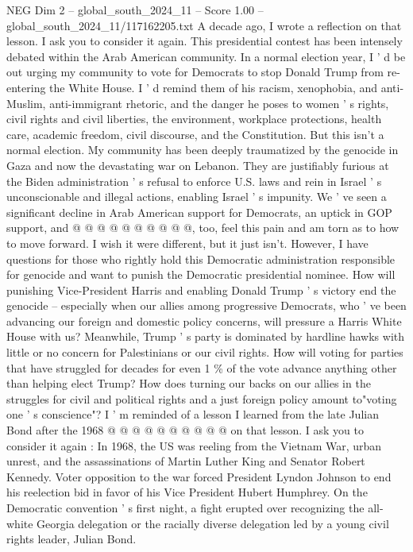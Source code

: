 \begin{textsample}{NEG Dim 2 – global\_south\_2024\_11 – Score 1.00 – global\_south\_2024\_11/117162205.txt}  \label{ex:f2_neg_201}
A decade ago, I wrote a reflection on that lesson.
I ask you to consider it again.
This presidential contest has been intensely debated within the Arab American community.
In a normal election year, I ' d be out urging my community to vote for Democrats to stop Donald Trump from re-entering the White House.
I ' d remind them of his racism, xenophobia, and anti-Muslim, anti-immigrant rhetoric, and the danger he poses to women ' s rights, civil rights and civil liberties, the environment, workplace protections, health care, academic freedom, civil discourse, and the Constitution.
But this isn't a normal election.
My community has been deeply traumatized by the genocide in Gaza and now the devastating war on Lebanon.
They are justifiably furious at the Biden administration ' s refusal to enforce U.S. laws and rein in Israel ' s unconscionable and illegal actions, enabling Israel ' s impunity.
We ' ve seen a significant decline in Arab American support for Democrats, an uptick in GOP support, and @ @ @ @ @ @ @ @ @ @, too, feel this pain and am torn as to how to move forward.
I wish it were different, but it just isn't.
However, I have questions for those who rightly hold this Democratic administration responsible for genocide and want to punish the Democratic presidential nominee.
How will punishing Vice-President Harris and enabling Donald Trump ' s victory end the genocide -- especially when our allies among progressive Democrats, who ' ve been advancing our foreign and domestic policy concerns, will pressure a Harris White House with us?
Meanwhile, Trump ' s party is dominated by hardline hawks with little or no concern for Palestinians or our civil rights.
How will voting for parties that have struggled for decades for even 1 \% of the vote advance anything other than helping elect Trump?
How does turning our backs on our allies in the struggles for civil and political rights and a just foreign policy amount to"voting one ' s conscience"?
I ' m reminded of a lesson I learned from the late Julian Bond after the 1968 @ @ @ @ @ @ @ @ @ @ on that lesson.
I ask you to consider it again : In 1968, the US was reeling from the Vietnam War, urban unrest, and the assassinations of Martin Luther King and Senator Robert Kennedy.
Voter opposition to the war forced President Lyndon Johnson to end his reelection bid in favor of his Vice President Hubert Humphrey.
On the Democratic convention ' s first night, a fight erupted over recognizing the all-white Georgia delegation or the racially diverse delegation led by a young civil rights leader, Julian Bond.

\end{textsample}
